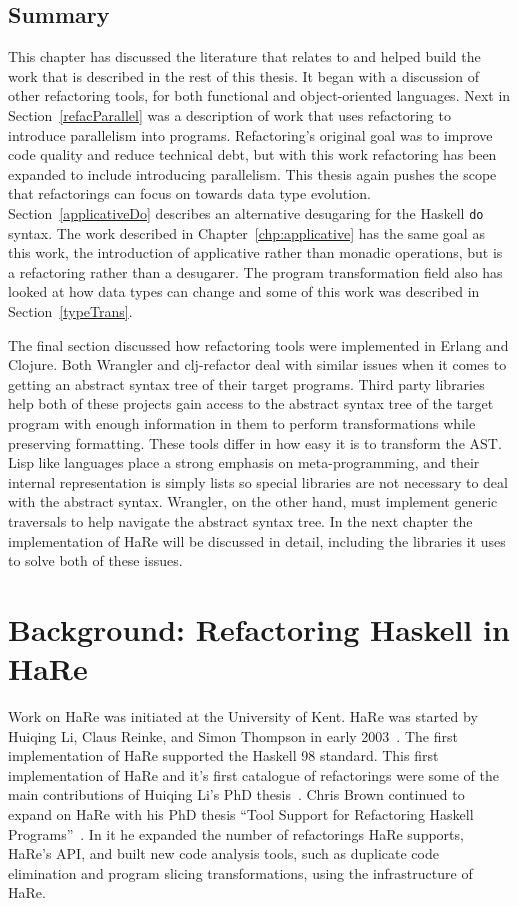 \section{Summary}

This chapter has discussed the literature that relates to and helped build the work that is described in the rest of this thesis. It began with a discussion of other refactoring tools, for both functional and object-oriented languages. Next in Section~\ref{refacParallel} was a description of work that uses refactoring to introduce parallelism into programs. Refactoring's original goal was to improve code quality and reduce technical debt, but with this work refactoring has been expanded to include introducing parallelism. This thesis again pushes the scope that refactorings can focus on towards data type evolution. Section~\ref{applicativeDo} describes an alternative desugaring for the Haskell \texttt{do} syntax. The work described in Chapter~\ref{chp:applicative} has the same goal as this work, the introduction of applicative rather than monadic operations, but is a refactoring rather than a desugarer. The program transformation field also has looked at how data types can change and some of this work was described in Section~\ref{typeTrans}. 

The final section discussed how refactoring tools were implemented in Erlang and Clojure. Both Wrangler and clj-refactor deal with similar issues when it comes to getting an abstract syntax tree of their target programs. Third party libraries help both of these projects gain access to the abstract syntax tree of the target program with enough information in them to perform transformations while preserving formatting. These tools differ in how easy it is to transform the AST. Lisp like languages place a strong emphasis on meta-programming, and their internal representation is simply lists so special libraries are not necessary to deal with the abstract syntax. Wrangler, on the other hand, must implement generic traversals to help navigate the abstract syntax tree. In the next chapter the implementation of HaRe will be discussed in detail, including the libraries it uses to solve both of these issues. 

\chapter{Background: Refactoring Haskell in HaRe}
\label{chp:hare}


Work on HaRe was initiated at the University of Kent. HaRe was started by Huiqing Li, Claus Reinke, and Simon Thompson in early 2003~\citep{refacWebsite}. The first implementation of HaRe supported the Haskell 98 standard. This first implementation of HaRe and it's first catalogue of refactorings were some of the main contributions of Huiqing Li's PhD thesis~\citep{huiqingThesis}.  Chris Brown continued to expand on HaRe with his PhD thesis ``Tool Support for Refactoring Haskell Programs''~\citep{brownThesis}. In it he expanded the number of refactorings HaRe supports, HaRe's API, and built new code analysis tools, such as duplicate code elimination and program slicing transformations, using the infrastructure of HaRe.

